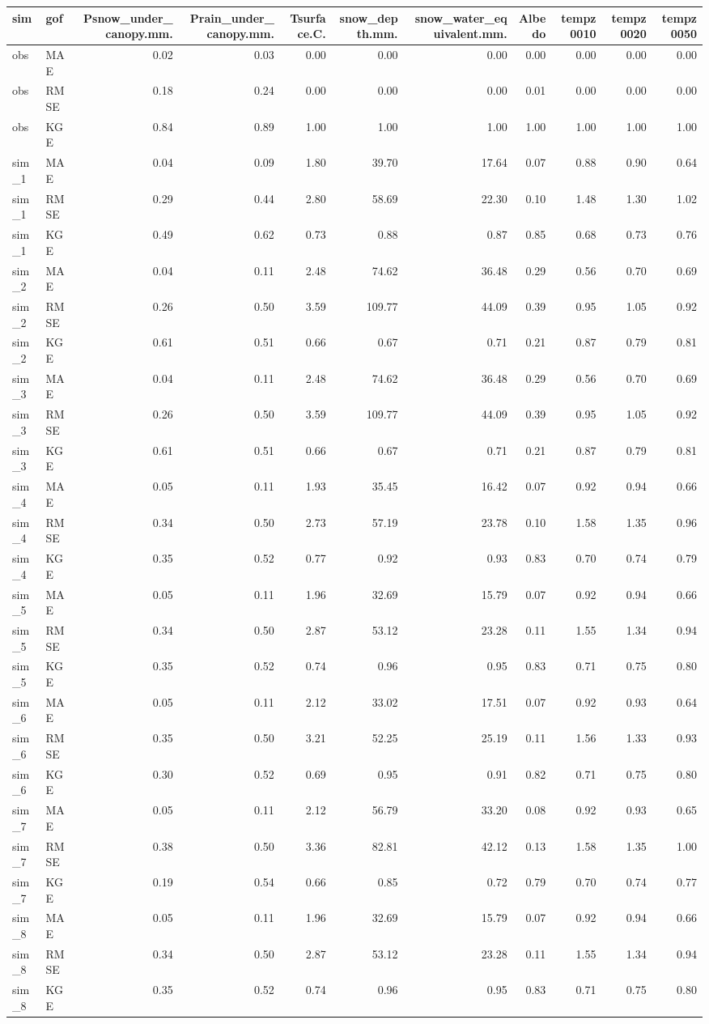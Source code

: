 \documentclass[
]{article}
\begin{document}
\begin{longtable}[]{@{}llrrrrrrrrr@{}}
\toprule
sim & gof & Psnow\_under\_canopy.mm. & Prain\_under\_canopy.mm. &
Tsurface.C. & snow\_depth.mm. & snow\_water\_equivalent.mm. & Albedo &
tempz0010 & tempz0020 & tempz0050\tabularnewline
\midrule
\endhead
obs & MAE & 0.02 & 0.03 & 0.00 & 0.00 & 0.00 & 0.00 & 0.00 & 0.00 &
0.00\tabularnewline
obs & RMSE & 0.18 & 0.24 & 0.00 & 0.00 & 0.00 & 0.01 & 0.00 & 0.00 &
0.00\tabularnewline
obs & KGE & 0.84 & 0.89 & 1.00 & 1.00 & 1.00 & 1.00 & 1.00 & 1.00 &
1.00\tabularnewline
sim\_1 & MAE & 0.04 & 0.09 & 1.80 & 39.70 & 17.64 & 0.07 & 0.88 & 0.90 &
0.64\tabularnewline
sim\_1 & RMSE & 0.29 & 0.44 & 2.80 & 58.69 & 22.30 & 0.10 & 1.48 & 1.30
& 1.02\tabularnewline
sim\_1 & KGE & 0.49 & 0.62 & 0.73 & 0.88 & 0.87 & 0.85 & 0.68 & 0.73 &
0.76\tabularnewline
sim\_2 & MAE & 0.04 & 0.11 & 2.48 & 74.62 & 36.48 & 0.29 & 0.56 & 0.70 &
0.69\tabularnewline
sim\_2 & RMSE & 0.26 & 0.50 & 3.59 & 109.77 & 44.09 & 0.39 & 0.95 & 1.05
& 0.92\tabularnewline
sim\_2 & KGE & 0.61 & 0.51 & 0.66 & 0.67 & 0.71 & 0.21 & 0.87 & 0.79 &
0.81\tabularnewline
sim\_3 & MAE & 0.04 & 0.11 & 2.48 & 74.62 & 36.48 & 0.29 & 0.56 & 0.70 &
0.69\tabularnewline
sim\_3 & RMSE & 0.26 & 0.50 & 3.59 & 109.77 & 44.09 & 0.39 & 0.95 & 1.05
& 0.92\tabularnewline
sim\_3 & KGE & 0.61 & 0.51 & 0.66 & 0.67 & 0.71 & 0.21 & 0.87 & 0.79 &
0.81\tabularnewline
sim\_4 & MAE & 0.05 & 0.11 & 1.93 & 35.45 & 16.42 & 0.07 & 0.92 & 0.94 &
0.66\tabularnewline
sim\_4 & RMSE & 0.34 & 0.50 & 2.73 & 57.19 & 23.78 & 0.10 & 1.58 & 1.35
& 0.96\tabularnewline
sim\_4 & KGE & 0.35 & 0.52 & 0.77 & 0.92 & 0.93 & 0.83 & 0.70 & 0.74 &
0.79\tabularnewline
sim\_5 & MAE & 0.05 & 0.11 & 1.96 & 32.69 & 15.79 & 0.07 & 0.92 & 0.94 &
0.66\tabularnewline
sim\_5 & RMSE & 0.34 & 0.50 & 2.87 & 53.12 & 23.28 & 0.11 & 1.55 & 1.34
& 0.94\tabularnewline
sim\_5 & KGE & 0.35 & 0.52 & 0.74 & 0.96 & 0.95 & 0.83 & 0.71 & 0.75 &
0.80\tabularnewline
sim\_6 & MAE & 0.05 & 0.11 & 2.12 & 33.02 & 17.51 & 0.07 & 0.92 & 0.93 &
0.64\tabularnewline
sim\_6 & RMSE & 0.35 & 0.50 & 3.21 & 52.25 & 25.19 & 0.11 & 1.56 & 1.33
& 0.93\tabularnewline
sim\_6 & KGE & 0.30 & 0.52 & 0.69 & 0.95 & 0.91 & 0.82 & 0.71 & 0.75 &
0.80\tabularnewline
sim\_7 & MAE & 0.05 & 0.11 & 2.12 & 56.79 & 33.20 & 0.08 & 0.92 & 0.93 &
0.65\tabularnewline
sim\_7 & RMSE & 0.38 & 0.50 & 3.36 & 82.81 & 42.12 & 0.13 & 1.58 & 1.35
& 1.00\tabularnewline
sim\_7 & KGE & 0.19 & 0.54 & 0.66 & 0.85 & 0.72 & 0.79 & 0.70 & 0.74 &
0.77\tabularnewline
sim\_8 & MAE & 0.05 & 0.11 & 1.96 & 32.69 & 15.79 & 0.07 & 0.92 & 0.94 &
0.66\tabularnewline
sim\_8 & RMSE & 0.34 & 0.50 & 2.87 & 53.12 & 23.28 & 0.11 & 1.55 & 1.34
& 0.94\tabularnewline
sim\_8 & KGE & 0.35 & 0.52 & 0.74 & 0.96 & 0.95 & 0.83 & 0.71 & 0.75 &
0.80\tabularnewline
\bottomrule
\end{longtable}
\end{document}
